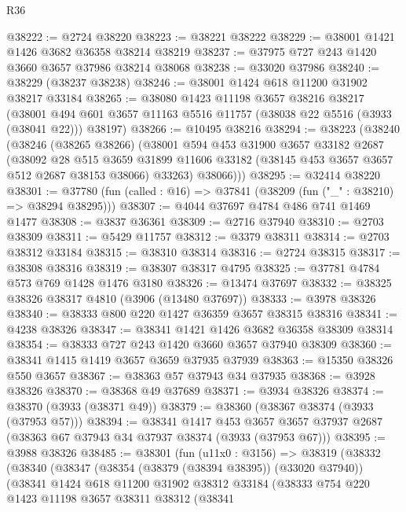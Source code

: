 \begin{lexlean}{R36}
\begin{coremodule}
@38222 := @2724 @38220
@38223 := @38221 @38222
@38229 := @38001 @1421 @1426 @3682 @36358 @38214 @38219
@38237 := @37975 @727 @243 @1420 @3660 @3657 @37986 @38214 @38068
@38238 := @33020 @37986
@38240 := @38229 (@38237 @38238)
@38246 := @38001 @1424 @618 @11200 @31902 @38217 @33184
@38265 := @38080
    @1423
    @11198
    @3657
    @38216
    @38217
    (@38001 @494 @601 @3657 @11163 @5516 @11757 (@38038 @22 @5516 (@3933 (@38041 @22))) @38197)
@38266 := @10495 @38216
@38294 := @38223
    (@38240
      (@38246
        (@38265 @38266)
        (@38001
          @594
          @453
          @31900
          @3657
          @33182
          @2687
          (@38092
            @28
            @515
            @3659
            @31899
            @11606
            @33182
            (@38145 @453 @3657 @3657 @512 @2687 @38153 @38066)
            @33263)
          @38066)))
@38295 := @32414 @38220
@38301 := @37780 (fun (called : @16) => @37841 (@38209 (fun ("_" : @38210) => @38294 @38295)))
@38307 := @4044 @37697 @4784 @486 @741 @1469 @1477
@38308 := @3837 @36361
@38309 := @2716 @37940
@38310 := @2703 @38309
@38311 := @5429 @11757
@38312 := @3379 @38311
@38314 := @2703 @38312 @33184
@38315 := @38310 @38314
@38316 := @2724 @38315
@38317 := @38308 @38316
@38319 := @38307 @38317 @4795
@38325 := @37781 @4784 @573 @769 @1428 @1476 @3180
@38326 := @13474 @37697
@38332 := @38325 @38326 @38317 @4810 (@3906 (@13480 @37697))
@38333 := @3978 @38326
@38340 := @38333 @800 @220 @1427 @36359 @3657 @38315 @38316
@38341 := @4238 @38326
@38347 := @38341 @1421 @1426 @3682 @36358 @38309 @38314
@38354 := @38333 @727 @243 @1420 @3660 @3657 @37940 @38309
@38360 := @38341 @1415 @1419 @3657 @3659 @37935 @37939
@38363 := @15350 @38326 @550 @3657
@38367 := @38363 @57 @37943 @34 @37935
@38368 := @3928 @38326
@38370 := @38368 @49 @37689
@38371 := @3934 @38326
@38374 := @38370 (@3933 (@38371 @49))
@38379 := @38360 (@38367 @38374 (@3933 (@37953 @57)))
@38394 := @38341
    @1417
    @453
    @3657
    @3657
    @37937
    @2687
    (@38363 @67 @37943 @34 @37937 @38374 (@3933 (@37953 @67)))
@38395 := @3988 @38326
@38485 := @38301
    (fun (u11x0 : @3156) =>
    @38319
      (@38332
        (@38340
          (@38347
            (@38354 (@38379 (@38394 @38395)) (@33020 @37940))
            (@38341
              @1424
              @618
              @11200
              @31902
              @38312
              @33184
              (@38333
                @754
                @220
                @1423
                @11198
                @3657
                @38311
                @38312
                (@38341

\end{coremodule}
\end{lexlean}
